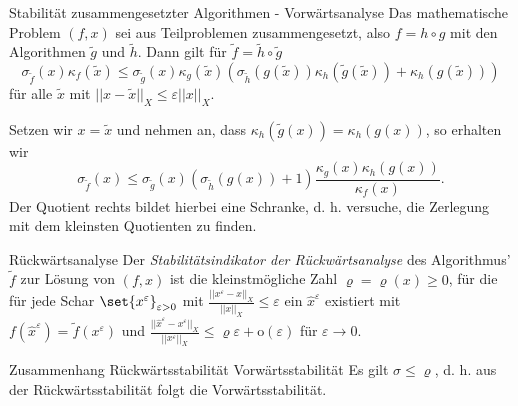 \begin{karte}{Stabilität zusammengesetzter Algorithmen - Vorwärtsanalyse}
    Das mathematische Problem \( (f,x) \) sei aus Teilproblemen zusammengesetzt, also \( f = h\circ g \)
    mit den Algorithmen \( \tilde{g} \) und \( \tilde{h} \). Dann gilt für \( \tilde{f} = \tilde{h} \circ \tilde{g} \)
    \[ \sigma_{\tilde{f}}(x) \kappa_f(\tilde{x}) \leq 
    \sigma_{\tilde{g}}(x) \kappa_g(\tilde{x}) \left( \sigma_{\tilde{h}}(g(\tilde{x})) \kappa_h(\tilde{g}(\tilde{x})) + \kappa_h(g(\tilde{x})) \right) \]
    für alle \( \tilde{x} \) mit \( ||x-\tilde{x}||_X \leq \varepsilon ||x||_X \).

    Setzen wir \( x = \tilde{x} \) und nehmen an, dass \( \kappa_h(\tilde{g}(x)) = \kappa_h(g(x)) \), so 
    erhalten wir 
    \[ \sigma_{\tilde{f}}(x) \leq \sigma_{\tilde{g}}(x) \left( \sigma_{\tilde{h}}(g(x)) + 1 \right) 
    \frac{ \kappa_g(x) \kappa_h(g(x)) }{ \kappa_f(x) }. \]
    Der Quotient rechts bildet hierbei eine Schranke, d. h. versuche, die Zerlegung mit dem kleinsten Quotienten zu finden.
\end{karte}

\begin{karte}{Rückwärtsanalyse}
    Der \textit{Stabilitätsindikator der Rückwärtsanalyse} des Algorithmus' \(\tilde{f}\) 
    zur Lösung von \( (f,x) \) ist die kleinstmögliche Zahl \( \varrho = \varrho(x) \geq 0 \), 
    für die für jede Schar \( \set{x^\varepsilon}_{\varepsilon>0} \) mit 
    \( \frac{||x^\varepsilon - x||_X}{||x||_X} \leq \varepsilon \) ein 
    \( \widehat{x}^\varepsilon \) existiert mit \( f(\widehat{x}^\varepsilon) = \tilde{f}(x^\varepsilon) \) 
    und \( \frac{ ||\widehat{x}^\varepsilon - x^\varepsilon||_X }{||x^\varepsilon||_X} \leq \varrho\varepsilon + \mathrm{o}(\varepsilon) \) 
    für \( \varepsilon \rightarrow 0 \).
\end{karte}

\begin{karte}{Zusammenhang Rückwärtsstabilität Vorwärtsstabilität}
    Es gilt \( \sigma \leq \varrho \), d. h. aus der Rückwärtsstabilität folgt die Vorwärtsstabilität.
\end{karte}